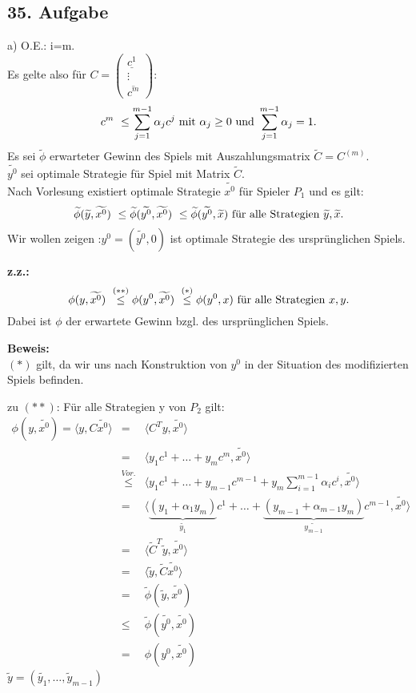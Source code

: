\documentclass[a4paper,11pt,twoside,titlepage]{article}
\begin{document}
\subsection*{35. Aufgabe}

a) O.E.: i=m.\\
Es gelte also für $C=\left(\begin{array}{c}\underline{c^1}\\ \vdots\\ \overline{c^m}\end{array}\right)$:
\[c^m\ \le \sum_{j=1}^{m-1}\alpha_jc^j \textnormal{ mit } \alpha_j\ge 0\textnormal{ und }\sum_{j=1}^{m-1}\alpha_j=1.\]
Es sei $\widetilde{\phi}$ erwarteter Gewinn des Spiels mit Auszahlungsmatrix $\widetilde{C}=C^{(m)}$.\\
$\widetilde{y^0}$ sei optimale Strategie für Spiel mit Matrix $\widetilde{C}$.\\
Nach Vorlesung existiert optimale Strategie $\widetilde{x^0}$ für Spieler $P_1$ und es gilt:
\[\widetilde{\phi}(\widetilde{y},\widetilde{x^0})\ \le\widetilde{\phi}(\widetilde{y^0},\widetilde{x^0})\ \le\widetilde{\phi}(\widetilde{y^0},\widetilde{x})\textnormal{ für alle Strategien } \widetilde{y},\widetilde{x}.\]
Wir wollen zeigen :$y^0=(\widetilde{y^0},0)$ ist optimale Strategie des ursprünglichen Spiels.

\textbf{z.z.:}
\[\phi(y,\widetilde{x^0})\ \stackrel{(**)}{\le} \phi(y^0,\widetilde{x^0})\ \stackrel{(*)}{\le} \phi(y^0,x)\textnormal{ für alle Strategien } x,y.\]
Dabei ist $\phi$ der erwartete Gewinn bzgl. des ursprünglichen Spiels.

\textbf{Beweis:}\\
$(*)$ gilt, da wir uns nach Konstruktion von $y^0$ in der Situation des modifizierten Spiels befinden.

zu $(**)$: Für alle Strategien y von $P_2$ gilt:
\begin{eqnarray*}\phi(y,\widetilde{x^0})=\langle y,C\widetilde{x^0}\rangle&=&\langle C^Ty,\widetilde{x^0}\rangle\\
&=&\langle y_1c^1+\ldots+y_mc^m, \widetilde{x^0}\rangle \\
&\stackrel{Vor.}{\le}&\langle y_1c^1+\ldots+y_{m-1}c^{m-1}+y_m\sum_{i=1}^{m-1}\alpha_ic^i,\widetilde{x^0}\rangle\\
&=&\langle \underbrace{(y_1+\alpha_1y_m)}_{\widetilde{y_1}}c^1+\ldots+\underbrace{(y_{m-1}+\alpha_{m-1}y_m)}_{\widetilde{y_{m-1}}}c^{m-1},\widetilde{x^0}\rangle\\ 
&=&\langle \widetilde{C}^T \widetilde{y},\widetilde{x^0}\rangle\\&=&\langle \widetilde{y},\widetilde{C}\widetilde{x^0} \rangle\\ &=&\widetilde{\phi}(\widetilde{y},\widetilde{x^0}) \\
&\le&\widetilde{\phi}(\widetilde{y^0},\widetilde{x^0})\\&=&\phi(y^0,\widetilde{x^0})\end{eqnarray*}
$\widetilde{y}=(\widetilde{y_1},\ldots,\widetilde{y}_{m-1})$
\end{document}
